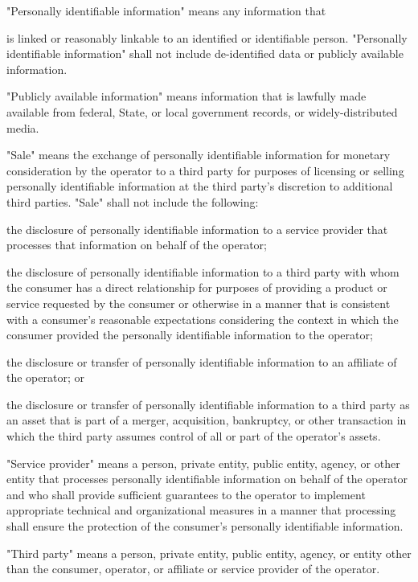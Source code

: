      "Personally identifiable information" means any information that

is linked or reasonably linkable to an identified or identifiable person. "Personally identifiable information" shall not include de-identified data or publicly available information.

     "Publicly available information" means information that is lawfully made available from federal, State, or local government records, or widely-distributed media.

     "Sale" means the exchange of personally identifiable information for monetary consideration by the operator to a third party for purposes of licensing or selling personally identifiable information at the third party's discretion to additional third parties. "Sale" shall not include the following:

     the disclosure of personally identifiable information to a service provider that processes that information on behalf of the operator;

     the disclosure of personally identifiable information to a third party with whom the consumer has a direct relationship for purposes of providing a product or service requested by the consumer or otherwise in a manner that is consistent with a consumer's reasonable expectations considering the context in which the consumer provided the personally identifiable information to the operator;

     the disclosure or transfer of personally identifiable information to an affiliate of the operator; or

     the disclosure or transfer of personally identifiable information to a third party as an asset that is part of a merger, acquisition, bankruptcy, or other transaction in which the third party assumes control of all or part of the operator's assets.

     "Service provider" means a person, private entity, public entity, agency, or other entity that processes personally identifiable information on behalf of the operator and who shall provide sufficient guarantees to the operator to implement appropriate technical and organizational measures in a manner that processing shall ensure the protection of the consumer's personally identifiable information.

     "Third party" means a person, private entity, public entity, agency, or entity other than the consumer, operator, or affiliate or service provider of the operator.

